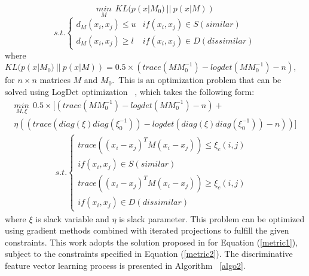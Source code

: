 \begin{equation}
	\underset{M}{min}~~KL(p(x|M_{0})~||~p(x|M))
\end{equation}
\begin{equation}
	s.t. \left\{\begin{matrix}
		d_{M}(x_{i},x_{j}) \leq u & if (x_{i},x_{j}) \in S(similar)    \\
		d_{M}(x_{i},x_{j}) \geq l & if (x_{i},x_{j}) \in D(dissimilar)
	\end{matrix}\right.
\end{equation}
where $KL(p(x|M_{0})~||~ p(x|M))= 0.5 \times (trace (MM_{0}^{-1}) - logdet
	(MM_{0}^{-1})-n) $, for $n \times n$ matrices $M$  and $M_{0}$.~This is an
optimization problem that can be solved using LogDet optimization
~\cite{davis2007information}, which takes the following form:
%
\begin{equation}
	\label{metric1}
	\begin{aligned}
		\underset{M,\xi}{min} ~~0.5 \times [(trace(MM_{0}^{-1}) - logdet (MM_{0}^{-1}) - n) + \\ \eta (( trace (diag (\xi) diag (\xi_{0}^{-1})) - logdet (diag(\xi) diag (\xi_{0}^{-1})) - n))]
	\end{aligned}
\end{equation}
\begin{equation}\label{metric2}
	\begin{split}
		s.t. \left\{\begin{matrix}
			trace((x_{i}-x_{j})^{T}M(x_{i}-x_{j})) \leq \xi_{c}(i,j) & \\  if (x_{i},x_{j}) \in S(similar)\\
			trace((x_{i}-x_{j})^{T}M(x_{i}-x_{j})) \geq \xi_{c}(i,j) & \\  if (x_{i},x_{j}) \in D(dissimilar)
		\end{matrix}\right.
	\end{split}
\end{equation}
where $\xi$ is slack variable and $\eta$ is slack parameter. This problem can be
optimized using gradient methods combined with iterated projections to fulfill
the given constraints. This work adopts the solution proposed in
\cite{davis2007information} for Equation (\ref{metric1}), subject to the
constraints specified in Equation (\ref{metric2}). The discriminative feature
vector learning
process is presented in Algorithm ~\ref{algo2}.\\
